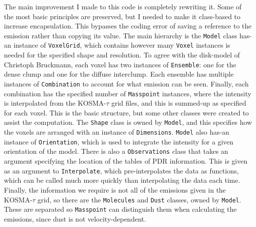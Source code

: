 \documentclass[amsmath,align]{paper}
\begin{document}
  The main improvement I made to this code is completely rewriting it. Some of the most basic principles are preserved, but I needed to make it class-based to increase encapsulation. This bypasses the coding error of saving a reference to the emission rather than copying its value. The main hierarchy is the \texttt{Model} class has-an instance of \texttt{VoxelGrid}, which contains however many \texttt{Voxel} instances is needed for the specified shape and resolution. To agree with the disk-model of Christoph Bruckmann, each voxel has two instances of \texttt{Ensemble}: one for the dense clump and one for the diffuse interclump. Each ensemble has multiple instances of \texttt{Combination} to account for what emission can be seen. Finally, each combination has the specified number of \texttt{Masspoint} instances, where the intensity is interpolated from the KOSMA-$\tau$ grid files, and this is summed-up as specified for each voxel. This is the basic structure, but some other classes were created to assist the computation. The \texttt{Shape} class is owned by \texttt{Model}, and this specifies how the voxels are arranged with an instance of \texttt{Dimensions}. \texttt{Model} also has-an instance of \texttt{Orientation}, which is used to integrate the intensity for a given orientation of the model. There is also a \texttt{Observations} class that takes an argument specifying the location of the tables of PDR information. This is given as an argument to \texttt{Interpolate}, which pre-interpolates the data as functions, which can be called much more quickly than interpolating the data each time. Finally, the information we require is not all of the emissions given in the KOSMA-$\tau$ grid, so there are the \texttt{Molecules} and \texttt{Dust} classes, owned by \texttt{Model}. These are separated so \texttt{Masspoint} can distinguish them when calculating the emissions, since dust is not velocity-dependent.
\end{document}

